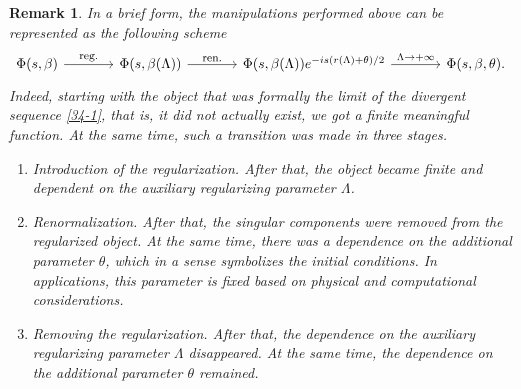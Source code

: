 \documentclass[a4paper]{article}
\newtheorem{remark}{Remark}
\begin{document}
\begin{remark}\label{34-r-4}
In a brief form, the manipulations performed above can be represented as the following scheme
\begin{equation}\label{34-15}
	\begin{tikzcd}[column sep=3pc]
		\Phi(s,\beta) \arrow{r}{\footnotesize\mbox{reg.}} & 
		\Phi(s,\beta(\Lambda)) \arrow{r}{\footnotesize\mbox{ren.}} &
		\Phi(s,\beta(\Lambda))e^{-is(r(\Lambda)+\theta)/2} \arrow{r}{\footnotesize\Lambda\to+\infty} &
		\Phi(s,\beta,\theta).
	\end{tikzcd}
\end{equation}
Indeed, starting with the object that was formally the limit of the divergent sequence \eqref{34-1}, that is, it did not actually exist, we got a finite meaningful function. At the same time, such a transition was made in three stages.
\begin{enumerate}
	\item Introduction of the regularization. After that, the object became finite and dependent on the auxiliary regularizing parameter $\Lambda$.
	\item Renormalization. After that, the singular components were removed from the regularized object. At the same time, there was a dependence on the additional parameter $\theta$, which in a sense symbolizes the initial conditions. In applications, this parameter is fixed based on physical and computational considerations.
	\item Removing the regularization. After that, the dependence on the auxiliary regularizing parameter $\Lambda$ disappeared. At the same time, the dependence on the additional parameter $\theta$ remained.
\end{enumerate}
\end{remark}
\end{document}
